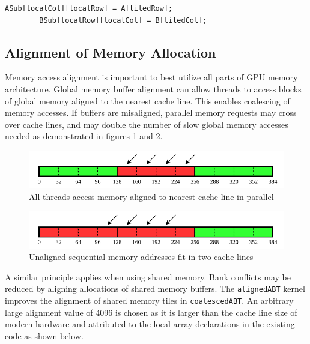 \documentclass[review=false, sigchi]{acmart}
\begin{document}
	\begin{lstlisting}[firstnumber=20]
		ASub[localCol][localRow] = A[tiledRow];
		BSub[localRow][localCol] = B[tiledCol];
	\end{lstlisting}
	
	
	\subsection{Alignment of Memory Allocation}
	
	Memory access alignment is important to best utilize all parts of GPU memory architecture. Global memory buffer alignment can allow threads to access blocks of global memory aligned to the nearest cache line. This enables coalescing of memory accesses. If buffers are misaligned, parallel memory requests may cross over cache lines, and may double the number of slow global memory accesses needed as demonstrated in figures \ref{fig: Simple memory alignment} and \ref{fig: Simple memory misalignment}.
	
	\begin{figure}[h]
		\includegraphics[width=\linewidth]{aligned_access_coalescing.pdf}
		\caption{All threads access memory aligned to nearest cache line in parallel \cite{cudaoptimisation}}
		\label{fig: Simple memory alignment}
	\end{figure}
	
	\begin{figure}[h]
		\includegraphics[width=\linewidth]{misaligned_access_coalescing.pdf}
		\caption{Unaligned sequential memory addresses fit in two cache lines \cite{cudaoptimisation}}
		\label{fig: Simple memory misalignment}
	\end{figure}
	
	A similar principle applies when using shared memory. Bank conflicts may be reduced by aligning allocations of shared memory buffers. The \texttt{alignedABT} kernel improves the alignment of shared memory tiles in \texttt{coalescedABT}.
	An arbitrary large alignment value of 4096 is chosen as it is larger than the cache line size of modern hardware and attributed to the local array declarations in the existing code as shown below.
	
\end{document}

